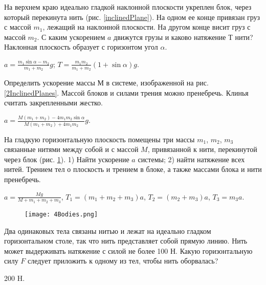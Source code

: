 \begin{ex} %
На верхнем краю идеально гладкой наклонной плоскости укреплен блок, через который перекинута нить (рис. \ref{inclinedPlane}). На одном ее конце привязан груз с массой $m_1$, лежащий на наклонной плоскости. На другом конце висит груз с массой $m_2$. С каким ускорением $a$ движутся грузы и каково натяжение $Т$ нити? Наклонная плоскость образует с горизонтом угол $\alpha$.
\begin{ans}
$a = \frac{m_1 \sin \alpha - m_2}{m_1 + m_2}g$; $T = \frac{m_1 m_2}{m_1 + m_2}\left( 1+ \sin \alpha \right)g$.
\end{ans}
\end{ex}

\begin{ex} %
Определить ускорение массы $М$ в системе, изображенной на рис. \ref{2InclinedPlanes}. Массой блоков и силами трения можно пренебречь. Клинья считать закрепленными жестко.
\begin{ans}
$a = \frac{M(m_1 + m_2) - 4 m_1 m_2 \sin \alpha}{M(m_1 + m_2) + 4 m_1 m_2}g$.
\end{ans}
\end{ex}

\begin{ex} %
На гладкую горизонтальную плоскость помещены три массы $m_1$, $m_2$, $m_3$ связанные нитями между собой и с массой $M$, привязанной к нити, перекинутой через блок (рис. \ref{4Bodies}). 1) Найти ускорение $a$ системы; 2) найти натяжение всех нитей. Трением тел о плоскость и трением в блоке, а также массами блока и нити пренебречь.
\begin{ans}
$a = \frac{Mg}{M + m_1 +m_2 +m_3}$, $T_1 = (m_1 +m_2 +m_3)a$, $T_2 = (m_2 +m_3)a$, $T_3 = m_3 a$.
\end{ans}
\end{ex}

\begin{figure}[h]
\centering
\texttt{[image: 4Bodies.png]}
\caption{}
\label{4Bodies}
\end{figure}

\begin{ex} %
Два одинаковых тела связаны нитью и лежат на идеально гладком горизонтальном столе, так что нить представляет собой прямую линию. Нить может выдерживать натяжение с силой не более 100 Н. Какую горизонтальную силу $F$ следует приложить к одному из тел, чтобы нить оборвалась?
\begin{ans}
200 H.
\end{ans}
\end{ex}

